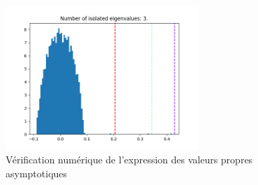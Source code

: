 \documentclass[../../main.tex]{subfiles} %
\begin{document}
\begin{figure}
	\centering
	\includegraphics[width=0.65\textwidth]{../../images/cas_homogene/val_asymp/n_4000.png}
	\caption{Vérification numérique de l'expression des valeurs propres 
	asymptotiques}
	\label{fig:vals_asymp}
\end{figure}
\end{document}
